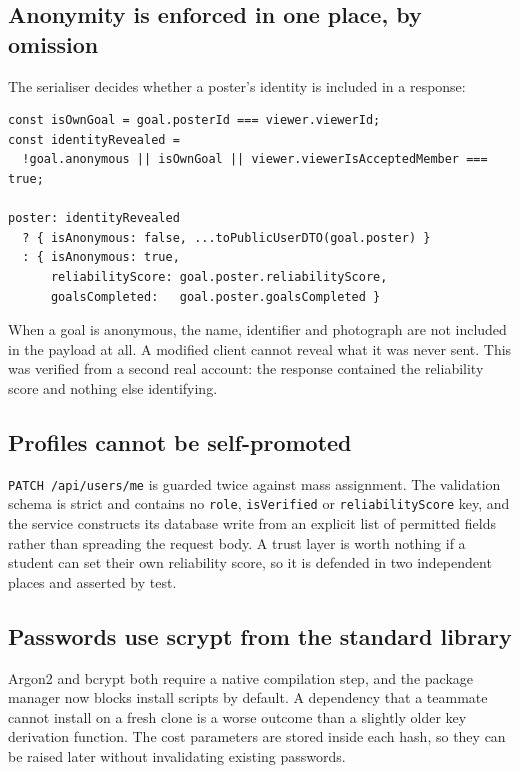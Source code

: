 \documentclass[twoside,12pt]{tietreport}
\begin{document}
\subsection{Anonymity is enforced in one place, by omission}

The serialiser decides whether a poster's identity is included in a response:

\begin{lstlisting}
const isOwnGoal = goal.posterId === viewer.viewerId;
const identityRevealed =
  !goal.anonymous || isOwnGoal || viewer.viewerIsAcceptedMember === true;

poster: identityRevealed
  ? { isAnonymous: false, ...toPublicUserDTO(goal.poster) }
  : { isAnonymous: true,
      reliabilityScore: goal.poster.reliabilityScore,
      goalsCompleted:   goal.poster.goalsCompleted }
\end{lstlisting}

When a goal is anonymous, the name, identifier and photograph are not included
in the payload at all. A modified client cannot reveal what it was never sent.
This was verified from a second real account: the response contained the
reliability score and nothing else identifying.

\subsection{Profiles cannot be self-promoted}

\texttt{PATCH /api/users/me} is guarded twice against mass assignment. The
validation schema is strict and contains no \texttt{role}, \texttt{isVerified} or
\texttt{reliabilityScore} key, and the service constructs its database write from
an explicit list of permitted fields rather than spreading the request body. A
trust layer is worth nothing if a student can set their own reliability score, so
it is defended in two independent places and asserted by test.

\subsection{Passwords use scrypt from the standard library}

Argon2 and bcrypt both require a native compilation step, and the package manager
now blocks install scripts by default. A dependency that a teammate cannot
install on a fresh clone is a worse outcome than a slightly older key derivation
function. The cost parameters are stored inside each hash, so they can be raised
later without invalidating existing passwords.
\end{document}
